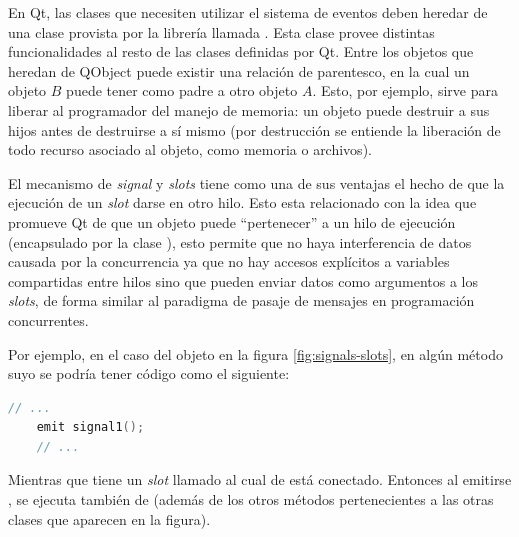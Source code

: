 En Qt, las clases que necesiten utilizar el sistema de eventos deben heredar de una clase provista por la librería llamada . Esta clase provee distintas funcionalidades al resto de las clases definidas por Qt. Entre los objetos que heredan de QObject puede existir una relación de parentesco, en la cual un objeto $B$ puede tener como padre a otro objeto $A$. Esto, por ejemplo, sirve para liberar al programador del manejo de memoria: un objeto puede destruir a sus hijos antes de destruirse a sí mismo (por destrucción se entiende la liberación de todo recurso asociado al objeto, como memoria o archivos).

El mecanismo de \emph{signal} y \emph{slots} tiene como una de sus ventajas el hecho de que la ejecución de un \emph{slot} darse en otro hilo. Esto esta relacionado con la idea que promueve Qt de que un objeto puede \enquote{pertenecer} a un hilo de ejecución (encapsulado por la clase ), esto permite que no haya interferencia de datos causada por la concurrencia ya que no hay accesos explícitos a variables compartidas entre hilos sino que pueden enviar datos como argumentos a los \emph{slots}, de forma similar al paradigma de pasaje de mensajes en programación concurrentes.

Por ejemplo, en el caso del objeto  en la figura \ref{fig:signals-slots}, en algún método suyo se podría tener código como el siguiente:
\begin{lstlisting}[language=c++]
	// ...
	emit signal1();
	// ...
\end{lstlisting}

Mientras que  tiene un \emph{slot} llamado  al cual  de  está conectado. Entonces al emitirse , se ejecuta también  de  (además de los otros métodos pertenecientes a las otras clases que aparecen en la figura).

